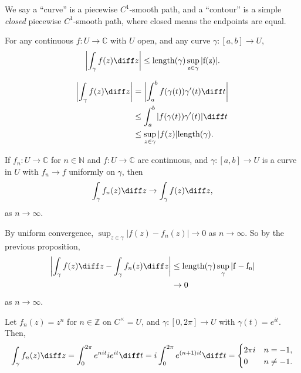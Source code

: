 \documentclass[12pt]{article}
\begin{document}
We say a ``curve'' is a piecewise $C^{1}$-smooth path, and a ``contour'' is a simple \emph{closed} piecewise $C^{1}$-smooth path, where closed means the endpoints are equal.

\begin{proposition}
	For any continuous $f : U \to \mathbb{C}$ with $U$ open, and any curve $\gamma : [a, b] \to U$,
	\[
		\biggl| \int_{\gamma}f(z) \diff z \biggr| \leq \rm{length}(\gamma) \sup_{z \in \gamma}|f(z)|
	.\]
\end{proposition}

\begin{proofbox}
	
	\begin{align*}
		\biggl| \int_{\gamma}f(z) \diff z \biggr| &= \biggl| \int_{a}^{b} f(\gamma(t)) \gamma'(t) \diff t \biggr| \\
							  &\leq \int_{a}^{b} |f(\gamma(t)) \gamma'(t)| \diff t \\
							  &\leq \sup_{z \in \gamma}|f(z)| \rm{length}(\gamma).
	\end{align*}
\end{proofbox}

\begin{proposition}
	If $f_n : U \to \mathbb{C}$ for $n \in \mathbb{N}$ and $f : U \to \mathbb{C}$ are continuous, and $\gamma : [a, b] \to U$ is a curve in $U$ with $f_n \to f$ uniformly on $\gamma$, then
	\[
	\int_{\gamma}f_n(z) \diff z \to \int_{\gamma}f(z) \diff z
	,\]
	as $n \to \infty$.
\end{proposition}

\begin{proofbox}
	By uniform convergence, $\sup_{z \in \gamma}|f(z) - f_n(z)| \to 0$ as $n \to \infty$. So by the previous proposition,
	\begin{align*}
		\biggl| \int_{\gamma}f(z) \diff z - \int_{\gamma}f_n(z) \diff z \biggr| &\leq \rm{length}(\gamma) \sup_{\gamma}|f - f_n| \\
											&\to 0
	\end{align*}
	as $n \to \infty$.
\end{proofbox}

\begin{exbox}
	Let $f_n(z) = z^{n}$ for $n \in \mathbb{Z}$ on $C^{\times} = U$, and $\gamma : [0, 2\pi] \to U$ with $\gamma(t) = e^{it}$. Then,
	\[
	\int_{\gamma}f_n(z) \diff z = \int_{0}^{2\pi} e^{n i t} i e^{it} \diff t = i \int_{0}^{2\pi} e^{(n+1)it} \diff t =
	\begin{cases}
		2 \pi i & n = -1, \\
		0 & n \neq -1.
	\end{cases}
	\]
\end{exbox}
\end{document}
